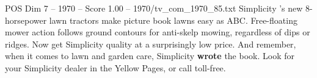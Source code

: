 \begin{textsample}{POS Dim 7 – 1970 – Score 1.00 – 1970/tv\_com\_1970\_85.txt}  \label{ex:f7_pos_037}
Simplicity 's new 8-horsepower lawn tractors make picture book lawns easy as ABC.
Free-floating mower action follows ground contours for anti-skelp mowing, regardless of dips or ridges.
Now get Simplicity quality at a surprisingly low price.
And remember, when it comes to lawn and garden care, Simplicity \textbf{wrote} the book.
Look for your Simplicity dealer in the Yellow Pages, or call toll-free.

\end{textsample}
